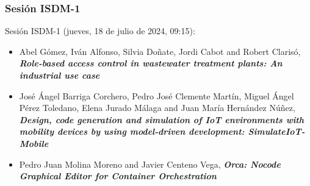 \begin{frame}
  \frametitle{Sesión ISDM-1}
Sesión ISDM-1 (jueves, 18 de julio de 2024, 09:15):
\begin{itemize}

\item \small{Abel Gómez, Iván Alfonso, Silvia Doñate, Jordi Cabot and Robert Clarisó}, %
      {\bfseries\itshape Role-based access control in wastewater treatment plants: An industrial use case}

\item \small{José Ángel Barriga Corchero, Pedro José Clemente Martín, Miguel Ángel Pérez Toledano, Elena Jurado Málaga and Juan María Hernández Núñez}, %
      {\bfseries\itshape Design, code generation and simulation of IoT environments with mobility devices by using model-driven development: SimulateIoT-Mobile}

\item \small{Pedro Juan Molina Moreno and Javier Centeno Vega}, %
      {\bfseries\itshape Orca: Nocode Graphical Editor for Container Orchestration}

\end{itemize}
\end{frame}